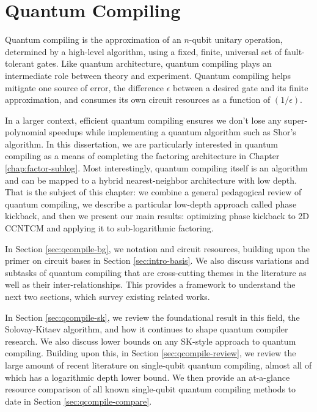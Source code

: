 \chapter{Quantum Compiling}
\label{chap:qcompile}

Quantum compiling is the approximation of an $n$-qubit
unitary operation, determined by a high-level algorithm,
using a fixed, finite, universal set
of fault-tolerant gates. Like quantum architecture, quantum
compiling plays an intermediate role between theory and experiment.
Quantum compiling helps mitigate one source of error,
the difference $\epsilon$ between a desired gate and its
finite approximation,
and consumes its own circuit resources as a function of
$(1 / \epsilon)$.

In a larger context, efficient quantum 
compiling ensures we don't lose any super-polynomial speedups
while implementing a quantum algorithm such as Shor's algorithm.
In this dissertation, we are particularly interested in
quantum compiling as a means of completing the
factoring architecture in Chapter \ref{chap:factor-sublog}.
Most interestingly, quantum compiling itself
is an algorithm and can be mapped to a hybrid nearest-neighbor
architecture with low depth. That is the subject of this chapter:
we combine a general pedagogical review of quantum compiling,
we describe a particular low-depth approach called phase kickback,
and then we present our main results: optimizing phase kickback
to \textsf{2D CCNTCM} and applying it to sub-logarithmic factoring.

In Section \ref{sec:qcompile-bg}, we notation and circuit resources,
building upon the primer on circuit bases in Section \ref{sec:intro-basis}.
We also discuss
variations and subtasks of quantum compiling that are cross-cutting themes
in the literature as well as their inter-relationships. This
provides a framework to understand the next two sections, which
survey existing related works.

In Section \ref{sec:qcompile-sk}, we review the foundational
result in this field, the Solovay-Kitaev algorithm, and how it
continues to shape quantum compiler research. We also discuss
lower bounds on any SK-style approach to quantum compiling.
Building upon this,
in Section \ref{sec:qcompile-review}, we review the large
amount of recent literature on single-qubit quantum compiling,
almost all of which has a logarithmic depth lower bound.
We then provide an
at-a-glance resource comparison of all known single-qubit quantum compiling methods
to date in Section \ref{sec:qcompile-compare}.

